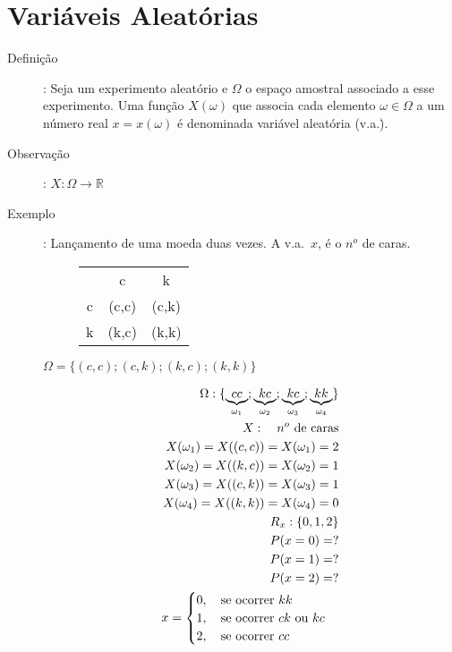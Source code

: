 \documentclass[11pt,a4paper]{book}
\begin{document}
   \section{Variáveis Aleatórias}
   \begin{description}
     \item [Definição]: Seja um experimento aleatório e $\Omega$ o espaço amostral associado 
       a esse experimento. Uma função $X(\omega)$ que associa cada elemento $\omega \in
       \Omega$ a um número real $x=x(\omega)$ é denominada variável aleatória (v.a.\.). 
       \begin{figure}[htpb]
         \centering
         \label{fig:23}
       \end{figure}
     \item [Observação]: $X:\Omega \to \mathbb{R}$

     \item [Exemplo]: Lançamento de uma moeda duas vezes. A v.a.\, $x$, é o $n^o$ de caras. 
       \begin{figure} [H]
         \centering
         \begin{tabular}{c c c}
           \toprule
           &c&k\\ \cmidrule{2-3}
           c&(c,c)&(c,k)\\ \cmidrule{2-3}
           k&(k,c)&(k,k)\\    \bottomrule
         \end{tabular}
         \label{tab:3}
       \end{figure}
       $\Omega = \{ (c,c); (c,k) ; (k,c) ; (k,k)\}$

       \begin{align*}
         \Omega : \{ \underbrace{cc}_{\omega_1};\underbrace{kc}_{\omega_2};\underbrace{kc}_{\omega_3};\underbrace{kk}_{\omega_4} \}\\
         X: \text{\quad $n^o$ de caras}\\
         X(\omega_1)= X((c,c))= X(\omega_1)=2\\
         X(\omega_2)= X((k,c))= X(\omega_2)=1\\
         X(\omega_3)= X((c,k))= X(\omega_3)=1\\
         X(\omega_4)= X((k,k))= X(\omega_4)=0\\
         R_x: \{0,1,2 \}\\
         P(x=0)=?\\
         P(x=1)=? \\
         P(x=2)=? \\
         x=
         \begin{cases}
           0, \text{\quad se ocorrer $kk$} \\
           1, \text{\quad se ocorrer $ck$ ou $kc$} \\
           2,\text{\quad se ocorrer $cc$}
         \end{cases}
       \end{align*}


\end{description}
\end{document}
